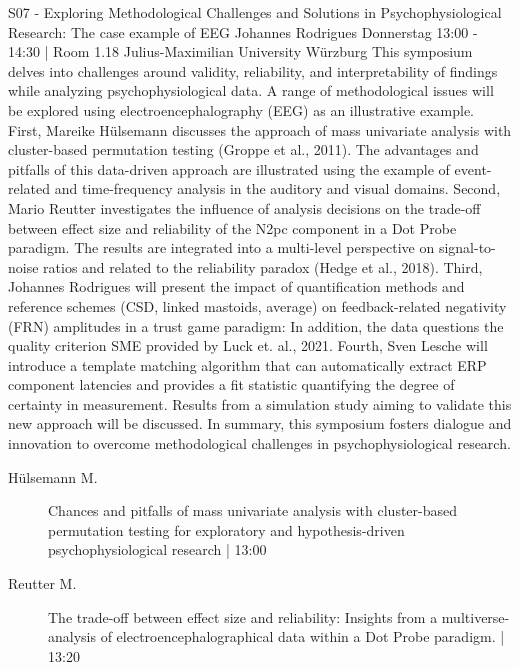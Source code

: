 
            \begin{symposium}
            {S07 - Exploring Methodological Challenges and Solutions in Psychophysiological Research: The case example of EEG}
            {Johannes Rodrigues}
            {Donnerstag 13:00 - 14:30 | Room 1.18}
            {Julius-Maximilian University Würzburg}
            This symposium delves into challenges around validity, reliability, and interpretability of findings while analyzing psychophysiological data. A range of methodological issues will be explored using electroencephalography (EEG) as an illustrative example.
First, Mareike Hülsemann discusses the approach of mass univariate analysis with cluster-based permutation testing (Groppe et al., 2011). The advantages and pitfalls of this data-driven approach are illustrated using the example of event-related and time-frequency analysis in the auditory and visual domains.
Second, Mario Reutter investigates the influence of analysis decisions on the trade-off between effect size and reliability of the N2pc component in a Dot Probe paradigm. The results are integrated into a multi-level perspective on signal-to-noise ratios and related to the reliability paradox (Hedge et al., 2018).
Third, Johannes Rodrigues will present the impact of quantification methods and reference schemes (CSD, linked mastoids, average) on feedback-related negativity (FRN) amplitudes in a trust game paradigm: In addition, the data questions the quality criterion SME provided by Luck et. al., 2021.
Fourth, Sven Lesche will introduce a template matching algorithm that can automatically extract ERP component latencies and provides a fit statistic quantifying the degree of certainty in measurement. Results from a simulation study aiming to validate this new approach will be discussed.
In summary, this symposium fosters dialogue and innovation to overcome methodological challenges in psychophysiological research.
            \begin{description}    
            
                \item [ Hülsemann M.] Chances and pitfalls of mass univariate analysis with cluster-based permutation testing for exploratory and hypothesis-driven psychophysiological research  \textcolor{mygray}{ | 13:00}    
                
                \item [ Reutter M.] The trade-off between effect size and reliability: Insights from a multiverse-analysis of electroencephalographical data within a Dot Probe paradigm. \textcolor{mygray}{ | 13:20}    
                

\end{description}
\end{symposium}
